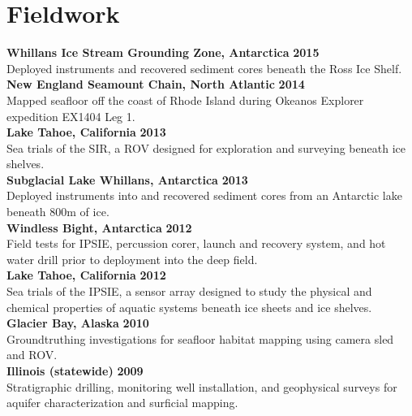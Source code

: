 \section{Fieldwork} 
\textbf{Whillans Ice Stream Grounding Zone, Antarctica} \hfill \textbf{2015}\\
\vspace{2mm}
Deployed instruments and recovered sediment cores beneath the Ross Ice Shelf. \\
\vspace{2mm}
\textbf{New England Seamount Chain, North Atlantic} \hfill \textbf{2014}\\
Mapped seafloor off the coast of Rhode Island during Okeanos Explorer expedition EX1404 Leg 1. \\
\vspace{2mm}
\textbf{Lake Tahoe, California} \hfill \textbf{2013}\\
Sea trials of the SIR, a ROV designed for exploration and surveying beneath ice shelves. \\
\vspace{2mm}
\textbf{Subglacial Lake Whillans, Antarctica} \hfill \textbf{2013}\\
Deployed instruments into and recovered sediment cores from an Antarctic lake beneath 800m of ice.\\
\vspace{2mm}
\textbf{Windless Bight, Antarctica} \hfill \textbf{2012}\\
Field tests for IPSIE, percussion corer, launch and recovery system, and hot water drill prior to deployment into the deep field.\\
\vspace{2mm}
\textbf{Lake Tahoe, California} \hfill \textbf{2012}\\
Sea trials of the IPSIE, a sensor array designed to study the physical and chemical properties of aquatic systems beneath ice sheets and ice shelves. \\
\vspace{2mm}
\textbf{Glacier Bay, Alaska} \hfill \textbf{2010}\\
Groundtruthing investigations for seafloor habitat mapping using camera sled and ROV.\\
\vspace{2mm}
\textbf{Illinois (statewide)} \hfill \textbf{2009}\\
Stratigraphic drilling, monitoring well installation, and geophysical surveys for aquifer characterization and surficial mapping. \\

